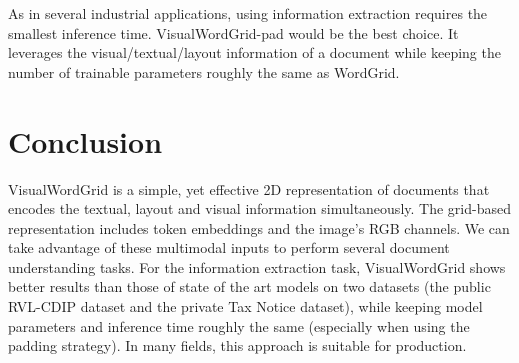 \documentclass[runningheads]{llncs}
\begin{document}
As in several industrial applications, using information extraction requires the smallest inference time. VisualWordGrid-pad would be the best choice. It leverages the visual/textual/layout information of a document while keeping the number of trainable parameters roughly the same as WordGrid. 

\section{Conclusion}
VisualWordGrid is a simple, yet  effective 2D representation of documents that encodes the textual, layout and visual information simultaneously. The grid-based representation includes token embeddings and the image's RGB channels. We can take advantage of these multimodal inputs to perform several document understanding tasks. For the information extraction task, VisualWordGrid shows better results than those of  state of the art models on two datasets (the public RVL-CDIP dataset and  the private Tax Notice dataset), while keeping model parameters and inference time roughly the same (especially when using the padding strategy). In many fields, this approach is suitable  for production.



\end{document}
